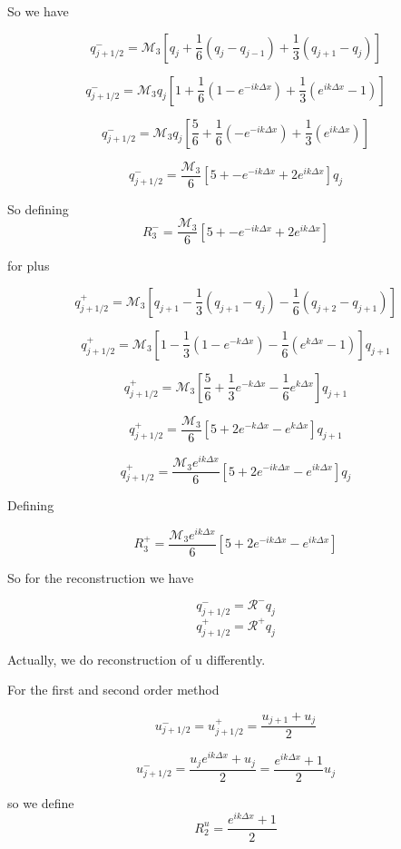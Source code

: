 \documentclass[12pt]{article}
\begin{document}
So we have

\[q^-_{j + 1/2} =\mathcal{M}_3\left[q_j + \frac{1}{6}\left( q_j - q_{j-1}\right) + \frac{1}{3}\left( q_{j+1} - q_{j}\right)\right]\]

\[q^-_{j + 1/2} =\mathcal{M}_3q_j\left[1 + \frac{1}{6}\left( 1 - e^{-ik\Delta x}\right) + \frac{1}{3}\left( e^{ik\Delta x} - 1\right)\right]\]

\[q^-_{j + 1/2} =\mathcal{M}_3q_j\left[\frac{5}{6} + \frac{1}{6}\left( - e^{-ik\Delta x}\right) + \frac{1}{3}\left( e^{ik\Delta x} \right)\right]\]

\[q^-_{j + 1/2} =\frac{\mathcal{M}_3}{6}\left[5 +  - e^{-ik\Delta x} + 2e^{ik\Delta x} \right]q_j\]

So defining 
\[R_3^-= \frac{\mathcal{M}_3}{6}\left[5 +  - e^{-ik\Delta x} + 2e^{ik\Delta x} \right]\]


for plus 

\[q^+_{j + 1/2} =\mathcal{M}_3\left[ q_{j+1} - \frac{1}{3}\left( q_{j+1} - q_{j}\right) - \frac{1}{6}\left( q_{j+2} - q_{j+1}\right) \right]\]

\[q^+_{j + 1/2} =\mathcal{M}_3\left[1 - \frac{1}{3}\left(1 - e^{-k\Delta x}\right) - \frac{1}{6}\left( e^{k\Delta x} - 1\right) \right]  q_{j+1}\]

\[q^+_{j + 1/2} =\mathcal{M}_3\left[\frac{5}{6} + \frac{1}{3}e^{-k\Delta x} - \frac{1}{6} e^{k\Delta x} \right]  q_{j+1}\]

\[q^+_{j + 1/2} = \frac{\mathcal{M}_3}{6}\left[5 + 2e^{-k\Delta x} - e^{k\Delta x} \right]  q_{j+1}\]

\[q^+_{j + 1/2} = \frac{\mathcal{M}_3 e^{ik\Delta x }}{6}\left[5 + 2e^{-ik\Delta x} - e^{ik\Delta x} \right]  q_{j}\]

Defining

\[R_3^+= \frac{\mathcal{M}_3 e^{ik\Delta x }}{6}\left[5 + 2e^{-ik\Delta x} - e^{ik\Delta x} \right]\] 


So for the reconstruction we have 

\[q^-_{j + 1/2} = \mathcal{R}^- q_j\]
\[q^+_{j + 1/2} = \mathcal{R}^+ q_j\]

Actually, we do reconstruction of u differently.

For the first and second order method

\[u^-_{j + 1/2} = u^+_{j + 1/2} = \frac{u_{j+1} + u_{j}}{2}\]

\[u^-_{j + 1/2} = \frac{u_{j}e^{ik\Delta x } + u_{j}}{2} =  \frac{e^{ik\Delta x } + 1}{2} u_{j}\]

so we define 
\[R^u_2 = \frac{e^{ik\Delta x } + 1}{2} \]
\end{document}
